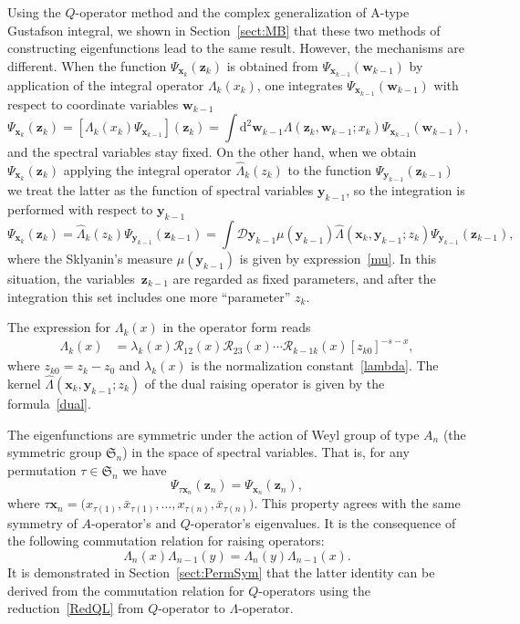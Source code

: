 \documentclass[10pt,a4paper]{amsart}
\numberwithin{equation}{section}
\begin{document}
Using the $Q$-operator method and the complex generalization of A-type Gustafson integral, we shown in Section~\ref{sect:MB} that these two methods of constructing eigenfunctions lead to the same result. However, the mechanisms are different. When the function $\Psi_{\bm{x}_{k}}(\bm{z}_k)$ is obtained from $\Psi_{\bm{x}_{k-1}}(\bm{w}_{k-1})$ by application of the integral operator $\Lambda_k(x_k)$, one integrates $\Psi_{\bm{x}_{k-1}}(\bm{w}_{k-1})$ with respect to coordinate variables $\bm{w}_{k-1}$
\begin{equation*}
	\Psi_{\bm{x}_{k}}(\bm{z}_k)=[\Lambda_k(x_k) \Psi_{\bm{x}_{k-1}}](\bm z_k) = \int \mathrm{d}^{2} \bm w_{k-1}
	\Lambda(\bm z_k,\bm w_{k-1};x_k) \Psi_{\bm{x}_{k-1}}(\bm w_{k-1}) ,
\end{equation*}
and the spectral variables stay fixed.
On the other hand, when we obtain $\Psi_{\bm{x}_{k}}(\bm{z}_k)$ applying the integral operator $\hat{\Lambda}_k(z_k)$ to the function $\Psi_{\bm{y}_{k-1}}(\bm{z}_{k-1})$ we treat the latter as the function of spectral variables $\bm{y}_{k-1}$, so the integration is performed with respect to $\bm{y}_{k-1}$
\begin{equation*}
	\Psi_{\bm{x}_{k}}(\bm{z}_{k}) = \hat{\Lambda}_k(z_k) \Psi_{\bm{y}_{k-1}}(\bm{z}_{k-1}) = \int \mathcal{D}\bm{y}_{k-1} \mu(\bm{y}_{k-1}) \hat{\Lambda}(\bm{x}_k,\bm{y}_{k-1};z_k) \Psi_{\bm{y}_{k-1}}(\bm{z}_{k-1}) ,
\end{equation*}
where the Sklyanin's measure $\mu(\bm{y}_{k-1})$ is given by expression~\eqref{mu}.
In this situation, the variables~$\bm{z}_{k-1}$ are regarded as fixed parameters, and after the integration this set includes one more ``parameter'' $z_k$.

The expression for $\Lambda_k(x)$ in the operator form reads
\begin{align*}
	\Lambda_k(x) & = \lambda_k(x) \mathcal{R}_{12}(x)\mathcal{R}_{23}(x)\cdots
	\mathcal{R}_{k-1 k}(x) [z_{k0}]^{-s-x} ,
\end{align*}
where $z_{k0}=z_k-z_0$ and $\lambda_k(x)$ is the normalization constant~\eqref{lambda}. The kernel $\hat{\Lambda}(\bm{x}_k,\bm{y}_{k-1};z_k)$ of the dual raising operator is given by the formula~\eqref{dual}.

The eigenfunctions are symmetric under the action of Weyl group of type $A_n$ (the symmetric group $\mathfrak{S}_n$) in the space of spectral variables. That is, for any permutation $\tau\in\mathfrak{S}_n$ we have
\begin{equation*}
	\Psi_{\tau \bm x_n}(\bm z_n) = \Psi_{\bm x_n}(\bm z_n) ,
\end{equation*}
where $\tau \bm x_n = \bigl(x_{\tau(1)},\bar{x}_{\tau(1)}, \dots , x_{\tau(n)},\bar{x}_{\tau(n)}\bigr)$. This property agrees with the same symmetry of $A$-operator's and $Q$-operator's eigenvalues. It is the consequence of the following commutation relation for raising operators:
\begin{equation*}
	\Lambda_n(x) \Lambda_{n-1}(y) =
	\Lambda_n(y) \Lambda_{n-1}(x) .
\end{equation*}
It is demonstrated in Section~\ref{sect:PermSym} that the latter identity can be derived from the commutation relation for $Q$-operators using the reduction~\eqref{RedQL} from $Q$-operator to $\Lambda$-operator.
\end{document}
